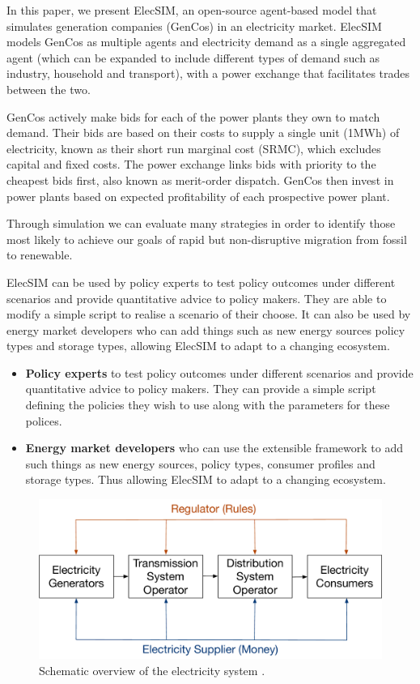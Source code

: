 In this paper, we present ElecSIM, an open-source agent-based model that simulates generation companies (GenCos) in an electricity market. ElecSIM models GenCos as multiple agents and electricity demand as a single aggregated agent (which can be expanded to include different types of demand such as industry, household and transport), with a power exchange that facilitates trades between the two. 

GenCos actively make bids for each of the power plants they own to match demand. Their bids are based {\color{red}on their costs to supply a single unit (1MWh) of electricity, known as} their short run marginal cost (SRMC), which excludes capital and fixed costs. The power exchange links bids with priority to the {\color{red}cheapest bids first, also known} as merit-order dispatch. GenCos then invest in power plants based on expected profitability of each prospective power plant.

Through simulation we can evaluate many strategies in order to identify those most likely to achieve our goals of rapid but non-disruptive migration from fossil to renewable.



ElecSIM can be used by policy experts to test policy outcomes under different scenarios and provide quantitative advice to policy makers. They are able to modify a simple script to realise a scenario of their choose. It can also be used by energy market developers who can add things such as new energy sources policy types and storage types, allowing ElecSIM to adapt to a changing ecosystem.

{\color{red}
\begin{itemize}
\item {\bf Policy experts} to test policy outcomes under different scenarios and provide quantitative advice to policy makers. They can provide a simple script defining the policies they wish to use along with the parameters for these polices.
\item {\bf Energy market developers} who can use the extensible framework to add such things as new energy sources, policy types, consumer profiles and storage types. Thus allowing ElecSIM to adapt to a changing ecosystem.
\end{itemize}
}



\begin{figure}
\centering
\includegraphics[width=0.9\linewidth]{figures/main_electricty_players}
\caption{{\color{red}Schematic overview of the electricity system \cite{Erbach2016}.}}
\label{fig:mainelectrictyplayers}
\end{figure}




